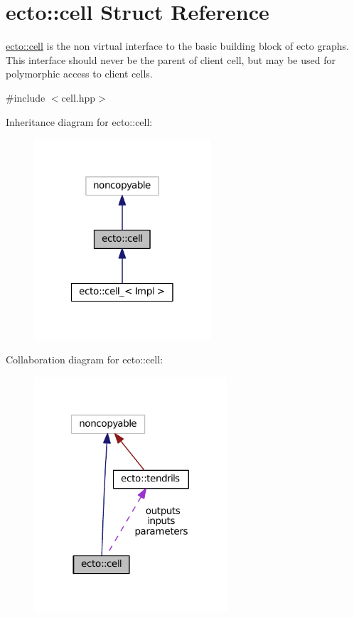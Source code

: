 \hypertarget{structecto_1_1cell}{\section{ecto\-:\-:cell Struct Reference}
\label{structecto_1_1cell}
}


\hyperlink{structecto_1_1cell}{ecto\-::cell} is the non virtual interface to the basic building block of ecto graphs. This interface should never be the parent of client cell, but may be used for polymorphic access to client cells.  




{\ttfamily \#include $<$cell.\-hpp$>$}



Inheritance diagram for ecto\-:\-:cell\-:\nopagebreak
\begin{figure}[H]
\begin{center}
\leavevmode
\includegraphics[width=186pt]{structecto_1_1cell__inherit__graph}
\end{center}
\end{figure}


Collaboration diagram for ecto\-:\-:cell\-:\nopagebreak
\begin{figure}[H]
\begin{center}
\leavevmode
\includegraphics[width=203pt]{structecto_1_1cell__coll__graph}
\end{center}
\end{figure}
